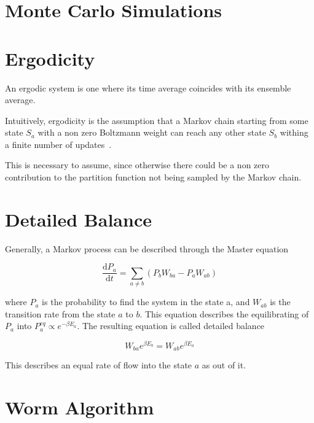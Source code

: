 \section{Monte Carlo Simulations}
\label{sec:MonteCarloSims}


\section{Ergodicity}
\label{sec:Ergodicity}

An ergodic system is one where its time average coincides with its ensemble average. 

Intuitively, ergodicity is the assumption that a Markov chain starting from some state $S_a$ with a non zero Boltzmann weight can reach any other state $S_b$ withing a finite number of updates~\cite{Zwanzig:nonequil_stat_mech}.

This is necessary to assume, since otherwise there could be a non zero contribution to the partition function not being sampled by the Markov chain.

\section{Detailed Balance}
\label{sec:DetailedBalance}

Generally, a Markov process can be described through the Master equation

\begin{equation}
    \frac{\mathrm d P_a}{\mathrm d t} = \sum_{a \neq b} \left ( P_b W_{ba} - P_a W_{ab} \right )
\end{equation}

where $P_a$ is the probability to find the system in the state a, and $W_{ab}$ is the transition rate from the state $a$ to $b$. This equation describes the equilibrating of $P_a$ into $P_a^{eq} \propto e^{-\beta E_a}$. The resulting equation is called detailed balance

\begin{equation}
    W_{ba} e^{\beta E_b} = W_{ab} e^{\beta E_a}
\end{equation}

This describes an equal rate of flow into the state $a$ as out of it.


\section{Worm Algorithm}
\label{sec:WormAlgorithm}

